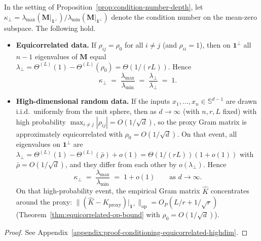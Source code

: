 \begin{corollary}\label{cor:conditioning-equicorrelated-highdim}
In the setting of Proposition~\ref{prop:condition-number-depth}, let \(\kappa_\perp=\lambda_{\max}(\mathbf{M}|_{\mathbf{1}^\perp})/\lambda_{\min}(\mathbf{M}|_{\mathbf{1}^\perp})\) denote the condition number on the mean-zero subspace. The following hold.
\begin{itemize}
  \item \textbf{Equicorrelated data.} If \(\rho_{ij}=\rho_0\) for all \(i\neq j\) (and \(\rho_{ii}=1\)), then on \(\mathbf{1}^\perp\) all \(n-1\) eigenvalues of \(\mathbf{M}\) equal \(\lambda_\perp=\Theta^{(L)}(1)-\Theta^{(L)}(\rho_0)=\Theta(1/(rL))\). Hence
  \[
  \kappa_\perp \;=\; \frac{\lambda_{\max}}{\lambda_{\min}} \;=\; \frac{\lambda_\perp}{\lambda_\perp} \;=\; 1.
  \]
  \item \textbf{High-dimensional random data.} If the inputs \(x_1,\ldots,x_n\in\mathbb{S}^{d-1}\) are drawn i.i.d.\ uniformly from the unit sphere, then as \(d\to\infty\) (with \(n,r,L\) fixed) with high probability \(\max_{i\neq j}|\rho_{ij}|=O(1/\sqrt{d})\), so the proxy Gram matrix is approximately equicorrelated with \(\rho_0=O(1/\sqrt{d})\). On that event, all eigenvalues on \(\mathbf{1}^\perp\) are \(\lambda_\perp=\Theta^{(L)}(1)-\Theta^{(L)}(\bar{\rho})+o(1)=\Theta(1/(rL))(1+o(1))\) with \(\bar{\rho}=O(1/\sqrt{d})\), and they differ from each other by \(o(\lambda_\perp)\). Hence
  \[
  \kappa_\perp \;=\; \frac{\lambda_{\max}}{\lambda_{\min}} \;=\; 1+o(1)\qquad\text{as }d\to\infty.
  \]
  On that high-probability event, the empirical Gram matrix \(\hat{K}\) concentrates around the proxy: \(\|(\hat{K}-K_{\mathrm{proxy}})|_{\mathbf{1}^\perp}\|_{\mathrm{op}}=O_P(L/r+1/\sqrt{r})\) (Theorem~\ref{thm:equicorrelated-op-bound} with \(\rho_0=O(1/\sqrt{d})\)).
\end{itemize}
\end{corollary}
\begin{proof}
See Appendix~\ref{appendix:proof-conditioning-equicorrelated-highdim}.
\end{proof}

